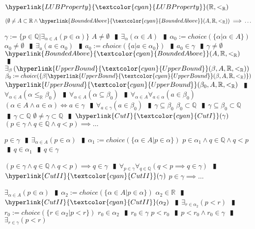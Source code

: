 \documentclass{book}
\newcommand{\wff}[1]{\hypertarget{#1}{\fbox{\textcolor{red}{$#1$}}\phantom{--}}}
\newcommand{\rf}[1]{\hyperlink{#1}{\textcolor{cyan}{#1}}}
\newcommand{\abr}{:=}
\newcommand{\pipe}{$\phantom{(}\vrectangleblack\phantom{)}$}
\newcommand{\pr}[1]{\left(#1\right)}
\begin{document}
\wff{LUBPropertyR} $\rf{LUBProperty}(\mathbb{R}, <_{\mathbb{R}})$
\begin{enumerate}
  \lit $\pr{\emptyset \neq A \subset \mathbb{R} \land \rf{BoundedAbove}(A, \mathbb{R}, <_{\mathbb{R}})} \implies \ldots$
  \begin{enumerate}
    \lit $\gamma \abr \{p \in \mathbb{Q} | \exists_{\alpha \in A}(p \in \alpha)\}$
    \lit $A \neq \emptyset$ \pipe $\exists_{\alpha}(\alpha \in A)$ \pipe $\alpha_0 \abr choice(\{\alpha | \alpha \in A\})$
    \lit $\alpha_0 \neq \emptyset$ \pipe $\exists_{a}(a \in \alpha_0)$ \pipe $a_0 \abr choice(\{a | a \in \alpha_0\})$ \pipe $a_0 \in \gamma$ \pipe $\gamma \neq \emptyset$
    \lit $\rf{BoundedAbove}(A, \mathbb{R}, <_{\mathbb{R}})$ \pipe $\exists_{\beta}\pr{\rf{UpperBound}(\beta, A, \mathbb{R}, <_{\mathbb{R}})}$
    \lit $\beta_0 \abr choice(\{\beta | \rf{UpperBound}(\beta, A, \mathbb{R}, <_{\mathbb{R}})\})$
    \lit $\rf{UpperBound}(\beta_0, A, \mathbb{R}, <_{\mathbb{R}})$ \pipe $\forall_{\alpha \in A}(\alpha \leq_{\mathbb{R}} \beta_0)$ \pipe $\forall_{\alpha \in A}(\alpha \subseteq \beta_0)$ \pipe $\forall_{\alpha \in A} \forall_{a \in \alpha}(a \in \beta_0)$
    \lit $(\alpha \in A \land a \in \alpha) \iff a \in \gamma$ \pipe $\forall_{a \in \gamma}(a \in \beta_0)$ \pipe $\gamma \subseteq \beta_0$
    \lit $\beta_0 \subset \mathbb{Q}$ \pipe $\gamma \subseteq \beta_0 \subset \mathbb{Q}$ \pipe $\gamma \subset \mathbb{Q}$
    \lit $\emptyset \neq \gamma \subset \mathbb{Q}$ \pipe $\rf{CutI}(\gamma)$
    \lit $(p \in \gamma \land q \in \mathbb{Q} \land q < p) \implies \ldots$
    \begin{enumerate}
      \lit $p \in \gamma$ \pipe $\exists_{\alpha \in A}(p \in \alpha)$ \pipe $\alpha_1 \abr choice(\{\alpha \in A | p \in \alpha\})$
      \lit $p \in \alpha_1 \land q \in \mathbb{Q} \land q < p$ \pipe $q \in \alpha_1$ \pipe $q \in \gamma$
    \end{enumerate}
    \lit $(p \in \gamma \land q \in \mathbb{Q} \land q < p) \implies q \in \gamma$ \pipe $\forall_{p \in \gamma} \forall_{q \in \mathbb{Q}}(q < p \implies q \in \gamma)$ \pipe $\rf{CutII}(\gamma)$
    \lit $p \in \gamma \implies \ldots$
    \begin{enumerate}
      \lit $\exists_{\alpha \in A}(p \in \alpha)$ \pipe $\alpha_2 \abr choice(\{\alpha \in A | p \in \alpha\})$
      \lit $\alpha_2 \in \mathbb{R}$ \pipe $\rf{CutII}(\alpha_2)$ \pipe $\exists_{r \in \alpha_2}(p < r)$ \pipe $r_0 \abr choice(\{r \in \alpha_2 | p < r\})$
      \lit $r_0 \in \alpha_2$ \pipe $r_0 \in \gamma$
      \lit $p < r_0$ \pipe $p < r_0 \land r_0 \in \gamma$ \pipe $\exists_{r \in \gamma}(p < r)$

\end{enumerate}
\end{enumerate}
\end{enumerate}
\end{document}

